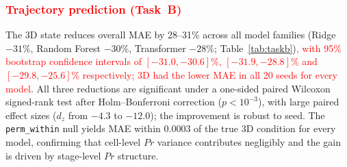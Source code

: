 \documentclass[5p,times,twocolumn]{elsarticle}
\newcommand{\rtag}[1]{}
\newcommand{\rev}[2]{\rtag{#1}\textcolor{red}{#2}}
\begin{document}
\subsubsection{\rev{R2.23}{Trajectory prediction (Task~B)}}
\label{sec:res_taskb}

The 3D state reduces overall MAE by 28--31\% across all model
families (Ridge $-31\%$, Random Forest $-30\%$, Transformer
$-28\%$; Table~\ref{tab:taskb})\rev{R1.4}{, with 95\% bootstrap
  confidence intervals of $[-31.0, -30.6]\%$, $[-31.9, -28.8]\%$
  and $[-29.8, -25.6]\%$ respectively; 3D had the lower MAE in all
  20 seeds for every model}.
All three reductions are significant under a one-sided paired
Wilcoxon signed-rank test after Holm--Bonferroni correction
($p < 10^{-3}$), with large paired effect sizes
($d_{z}$ from $-4.3$ to $-12.0$); the improvement is robust to
seed.
The \texttt{perm\_within} null yields MAE within $0.0003$ of the
true 3D condition for every model, confirming that cell-level
$Pr$ variance contributes negligibly and the gain is driven by
stage-level $Pr$ structure.

\begin{table}[!htbp]
  \caption{%
    Task B per-dimension MAE decomposition.
    The overall 3D MAE improvement (Table~\ref{tab:taskb})
    averages an easy-to-predict $Pr$ column into the mean;
    the per-dimension breakdown shows the $P$ and $D$ forecasts
    are statistically unchanged between 2D and 3D.
    $\text{MAE}_{PD}$ averages over the two original dimensions
    only. Mean $\pm$ std across 20 seeds.}
  \label{tab:taskb_perdim}
  \centering
\end{table}
\end{document}
